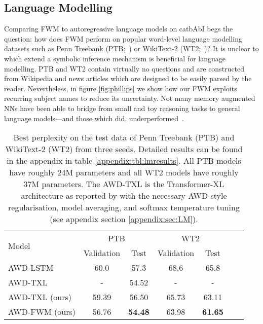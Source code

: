\documentclass{article} \usepackage{iclr2021_conference,times}
\begin{document}
\subsection{Language Modelling}
\label{subsec:LM}
Comparing FWM to autoregressive language models on catbAbI begs the question: how does FWM perform on popular word-level language modelling datasets such as Penn Treebank (PTB;~\citet{mikolov2010recurrent}) or WikiText-2 (WT2;~\citet{merity2016pointer})?
It is unclear to which extend a symbolic inference mechanism is beneficial for language modelling.
PTB and WT2 contain virtually no questions and are constructed from Wikipedia and news articles which are designed to be easily parsed by the reader.
Nevertheless, in figure \ref{fig:phillips} we show how our FWM exploits recurring subject names to reduce its uncertainty.
Not many memory augmented NNs have been able to bridge from small and toy reasoning tasks to general language models---and those which did, underperformed~\citep{paperno-etal-2016-lambada, sukhbaatar2015end}.
\begin{table}[h]
  \vspace{-3pt}
  \caption{
  Best perplexity on the test data of Penn Treebank (PTB) and WikiText-2 (WT2) from three seeds. Detailed results can be found in the appendix in table \ref{appendix:tbl:lmresults}. All PTB models have roughly 24M parameters and all WT2 models have roughly 37M parameters. The AWD-TXL is the Transformer-XL architecture as reported by \citet{dai2019transformer} with the necessary AWD-style regularisation, model averaging, and softmax temperature tuning (see appendix section \ref{appendix:sec:LM}).}
  \label{tbl:LM}
  \centering
  \vspace{5pt}
  \def\mystrut{\rule{0pt}{1\normalbaselineskip}}
  \setlength{\tabcolsep}{4pt}
  \begin{tabular}{lcccccc}
    \toprule
    \multirow{2}{*}{Model} & \multicolumn{2}{c}{PTB} &
    \multicolumn{2}{c}{WT2} \\
    & Validation & Test
    & Validation & Test\\
    \midrule
    AWD-LSTM \citep{merity2018regularizing} & 60.0 
                                            & 57.3
                                            & 68.6
                                            & 65.8  \\
    AWD-TXL \citep{dai2019transformer} & - 
                                       & 54.52
                                       & -
                                       & - \\
AWD-TXL (ours)  \rule{0pt}{1.2\normalbaselineskip} & 59.39 
                    & 56.50
                    & 65.73
                    & 63.11 \\
    AWD-FWM (ours) & 56.76
                   & \textbf{54.48} 
                   & 63.98
                   & \textbf{61.65} \\
    \bottomrule 
  \end{tabular}
  \vspace{-4pt}
\end{table}
\end{document}
